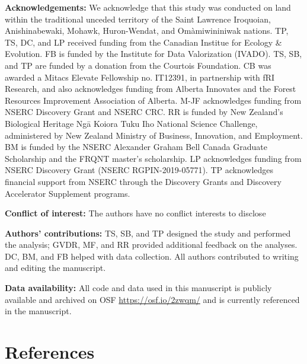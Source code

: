 \documentclass[11pt]{article}
\begin{document}
\textbf{Acknowledgements:} We acknowledge that this study was conducted
on land within the traditional unceded territory of the Saint Lawrence
Iroquoian, Anishinabewaki, Mohawk, Huron-Wendat, and Omàmiwininiwak
nations. TP, TS, DC, and LP received funding from the Canadian Institue
for Ecology \& Evolution. FB is funded by the Institute for Data
Valorization (IVADO). TS, SB, and TP are funded by a donation from the
Courtois Foundation. CB was awarded a Mitacs Elevate Fellowship no.
IT12391, in partnership with fRI Research, and also acknowledges funding
from Alberta Innovates and the Forest Resources Improvement Association
of Alberta. M-JF acknowledges funding from NSERC Discovery Grant and
NSERC CRC. RR is funded by New Zealand's Biological Heritage Ngā Koiora
Tuku Iho National Science Challenge, administered by New Zealand
Ministry of Business, Innovation, and Employment. BM is funded by the
NSERC Alexander Graham Bell Canada Graduate Scholarship and the FRQNT
master's scholarship. LP acknowledges funding from NSERC Discovery Grant
(NSERC RGPIN-2019-05771). TP acknowledges financial support from NSERC
through the Discovery Grants and Discovery Accelerator Supplement
programs.

\textbf{Conflict of interest:} The authors have no conflict interests to
disclose

\textbf{Authors' contributions:} TS, SB, and TP designed the study and
performed the analysis; GVDR, MF, and RR provided additional feedback on
the analyses. DC, BM, and FB helped with data collection. All authors
contributed to writing and editing the manuscript.

\textbf{Data availability:} All code and data used in this manuscript is
publicly available and archived on OSF \url{https://osf.io/2zwqm/} and
is currently referenced in the manuscript.

\hypertarget{references}{%
\section*{References}\label{references}}
\end{document}
